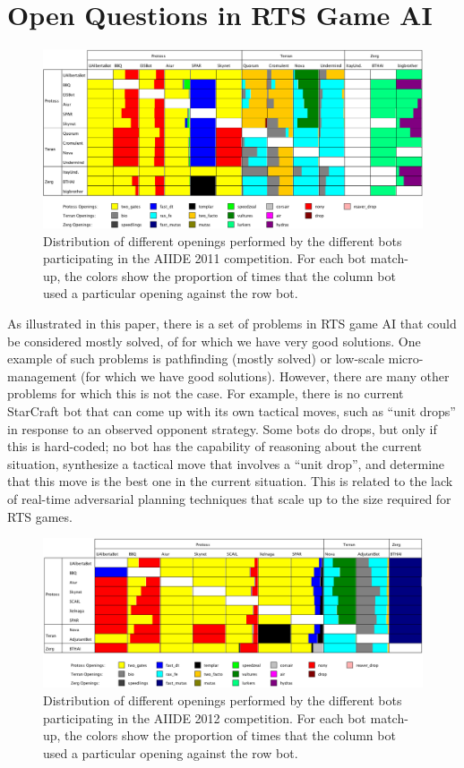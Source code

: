 \documentclass[journal]{IEEEtran}
\begin{document}
\section{Open Questions in RTS Game AI}\label{sec:questions}

\begin{figure}[tb]
    \centering
    \includegraphics[width=\textwidth]{figures/botopenings2011.png}
    \caption{Distribution of different openings performed by the different bots participating in the AIIDE 2011 competition. For each bot match-up, the colors show the proportion of times that the column bot used a particular opening against the row bot.}
    \label{fig:aiide2011-botopenings}
\end{figure}

As illustrated in this paper, there is a set of problems in RTS game AI that could be considered mostly solved, of for which we have very good solutions. One example of such problems is pathfinding (mostly solved) or low-scale micro-management (for which we have good solutions). However, there are many other problems for which this is not the case. For example, there is no current StarCraft bot that can come up with its own tactical moves, such as ``unit drops'' in response to an observed opponent strategy. Some bots do drops, but only if this is hard-coded; no bot has the capability of reasoning about the current situation, synthesize a tactical move that involves a ``unit drop'', and determine that this move is the best one in the current situation. This is related to the lack of real-time adversarial planning techniques that scale up to the size required for RTS games. 


\begin{figure}[tb]
    \centering
    \includegraphics[width=\textwidth]{figures/botopenings2012.png}
    \caption{Distribution of different openings performed by the different bots participating in the AIIDE 2012 competition. For each bot match-up, the colors show the proportion of times that the column bot used a particular opening against the row bot.}
    \label{fig:aiide2012-botopenings}
\end{figure}
\end{document}
